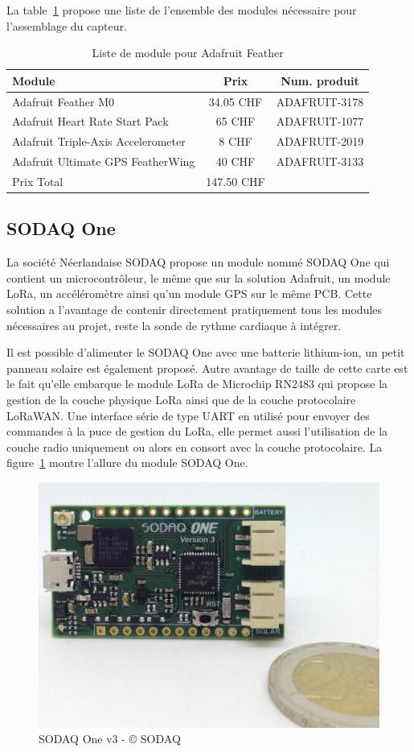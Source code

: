 La table~\ref{tab:ada_feather_liste} propose une liste de l'ensemble des modules nécessaire pour l'assemblage du capteur.

\begin{table}[htb]
\caption[Liste de module pour Adafruit Feather]{Liste de module pour Adafruit Feather}
\label{tab:ada_feather_liste}
\centering
\begin{tabular}{lcc}
\toprule
Module & Prix & Num. produit \\ 
\midrule
Adafruit Feather M0 & 34.05 CHF & ADAFRUIT-3178 \\
Adafruit Heart Rate Start Pack & 65 CHF & ADAFRUIT-1077 \\
Adafruit Triple-Axis Accelerometer & 8 CHF & ADAFRUIT-2019 \\
Adafruit Ultimate GPS FeatherWing & 40 CHF & ADAFRUIT-3133 \\
\midrule
Prix Total & 147.50 CHF &  \\
\bottomrule 
\end{tabular}
\end{table}

\subsection{SODAQ One}

La société Néerlandaise SODAQ propose un module nommé SODAQ One qui contient un microcontrôleur, le même que sur la solution Adafruit, un module LoRa, un accéléromètre ainsi qu’un module GPS sur le même PCB. Cette solution a l’avantage de contenir directement pratiquement tous les modules nécessaires au projet, reste la sonde de rythme cardiaque à intégrer. 

Il est possible d’alimenter le SODAQ One avec une batterie lithium-ion, un petit panneau solaire est également proposé. Autre avantage de taille de cette carte est le fait qu’elle embarque le module LoRa de Microchip RN2483 qui propose la gestion de la couche physique LoRa ainsi que de la couche protocolaire LoRaWAN. Une interface série de type UART en utilisé pour envoyer des commandes à la puce de gestion du LoRa, elle permet aussi l’utilisation de la couche radio uniquement ou alors en consort avec la couche protocolaire. La figure~\ref{fig:sodaq_one} montre l'allure du module SODAQ One.

\begin{figure}[htb]
\centering 
\includegraphics[width=0.4\columnwidth]{../images/sodaq-one-eu-rn2483-v3.jpg} 
\caption[SODAQ One v3]{SODAQ One v3 - © SODAQ}
\label{fig:sodaq_one}
\end{figure}

